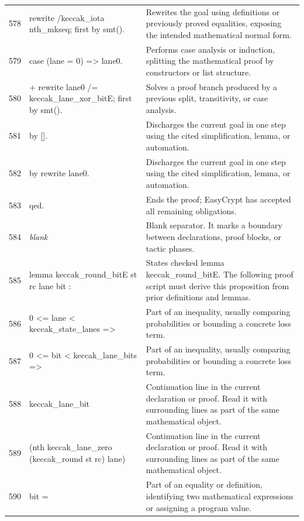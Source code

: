 \documentclass[10pt]{article}
\begin{document}
\begin{longtable}{r L{0.53\textwidth} L{0.37\textwidth}}
578 & {\ttfamily\scriptsize rewrite /keccak\_iota nth\_mkseq; first by smt().} & Rewrites the goal using definitions or previously proved equalities, exposing the intended mathematical normal form. \\
579 & {\ttfamily\scriptsize case (lane = 0) => lane0.} & Performs case analysis or induction, splitting the mathematical proof by constructors or list structure. \\
580 & {\ttfamily\scriptsize + rewrite lane0 /= keccak\_lane\_xor\_bitE; first by smt().} & Solves a proof branch produced by a previous split, transitivity, or case analysis. \\
581 & {\ttfamily\scriptsize   by [].} & Discharges the current goal in one step using the cited simplification, lemma, or automation. \\
582 & {\ttfamily\scriptsize by rewrite lane0.} & Discharges the current goal in one step using the cited simplification, lemma, or automation. \\
583 & {\ttfamily\scriptsize qed.} & Ends the proof; EasyCrypt has accepted all remaining obligations. \\
584 & {\ttfamily\scriptsize \emph{blank}} & Blank separator.  It marks a boundary between declarations, proof blocks, or tactic phases. \\
585 & {\ttfamily\scriptsize lemma keccak\_round\_bitE st rc lane bit :} & States checked lemma keccak\_round\_bitE.  The following proof script must derive this proposition from prior definitions and lemmas. \\
586 & {\ttfamily\scriptsize   0 <= lane < keccak\_state\_lanes =>} & Part of an inequality, usually comparing probabilities or bounding a concrete loss term. \\
587 & {\ttfamily\scriptsize   0 <= bit < keccak\_lane\_bits =>} & Part of an inequality, usually comparing probabilities or bounding a concrete loss term. \\
588 & {\ttfamily\scriptsize   keccak\_lane\_bit} & Continuation line in the current declaration or proof.  Read it with surrounding lines as part of the same mathematical object. \\
589 & {\ttfamily\scriptsize     (nth keccak\_lane\_zero (keccak\_round st rc) lane)} & Continuation line in the current declaration or proof.  Read it with surrounding lines as part of the same mathematical object. \\
590 & {\ttfamily\scriptsize     bit =} & Part of an equality or definition, identifying two mathematical expressions or assigning a program value. \\

\end{longtable}
\end{document}
